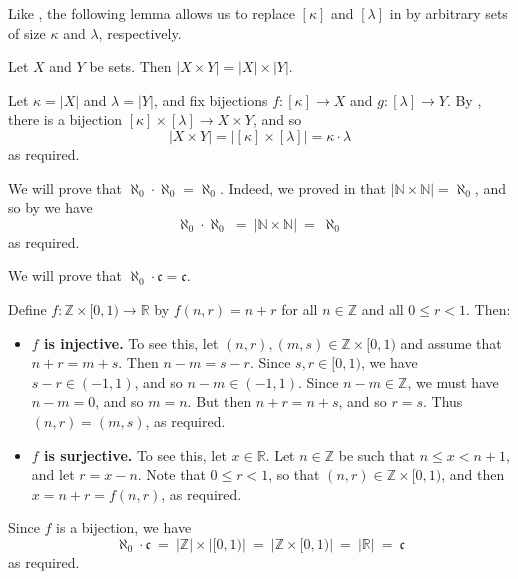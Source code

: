 Like , the following lemma allows us to replace $[\kappa]$ and $[\lambda]$ in  by arbitrary sets of size $\kappa$ and $\lambda$, respectively.

\begin{lemma}
\label{lemCardinalityOfProductOfSets}
Let $X$ and $Y$ be sets. Then $|X \times Y| = |X| \times |Y|$.
\end{lemma}

\begin{cproof}
Let $\kappa = |X|$ and $\lambda = |Y|$, and fix bijections $f : [\kappa] \to X$ and $g : [\lambda] \to Y$. By , there is a bijection $[\kappa] \times [\lambda] \to X \times Y$, and so
\[ |X \times Y| = |[\kappa] \times [\lambda]| = \kappa \cdot \lambda \]
as required.
\end{cproof}

\begin{example}
\label{exAlephNaughtTimesAlephNaughtEqualsAlephNaught}
We will prove that $\aleph_0 \cdot \aleph_0 = \aleph_0$. Indeed, we proved in  that $|\mathbb{N} \times \mathbb{N}| = \aleph_0$, and so by  we have
\[ \aleph_0 \cdot \aleph_0 ~=~ |\mathbb{N} \times \mathbb{N}| ~=~ \aleph_0 \]
as required.
\end{example}

\begin{example}
We will prove that $\aleph_0 \cdot \mathfrak{c} = \mathfrak{c}$.

Define $f : \mathbb{Z} \times [0,1) \to \mathbb{R}$ by $f(n,r) = n+r$ for all $n \in \mathbb{Z}$ and all $0 \le r < 1$. Then:
\begin{itemize}
\item \textbf{$f$ is injective.} To see this, let $(n,r), (m,s) \in \mathbb{Z} \times [0,1)$ and assume that $n+r=m+s$. Then $n-m=s-r$. Since $s,r \in [0,1)$, we have $s-r \in (-1,1)$, and so $n-m \in (-1,1)$. Since $n-m \in \mathbb{Z}$, we must have $n-m = 0$, and so $m=n$. But then $n+r=n+s$, and so $r=s$. Thus $(n,r) = (m,s)$, as required.
\item \textbf{$f$ is surjective.} To see this, let $x \in \mathbb{R}$. Let $n \in \mathbb{Z}$ be such that $n \le x < n+1$, and let $r = x-n$. Note that $0 \le r < 1$, so that $(n,r) \in \mathbb{Z} \times [0,1)$, and then $x = n+r = f(n,r)$, as required.
\end{itemize}

Since $f$ is a bijection, we have
\[ \aleph_0 \cdot \mathfrak{c} ~=~ |\mathbb{Z}| \times |[0,1)| ~=~ |\mathbb{Z} \times [0,1)| ~=~ |\mathbb{R}| ~=~ \mathfrak{c} \]
as required.
\end{example}

